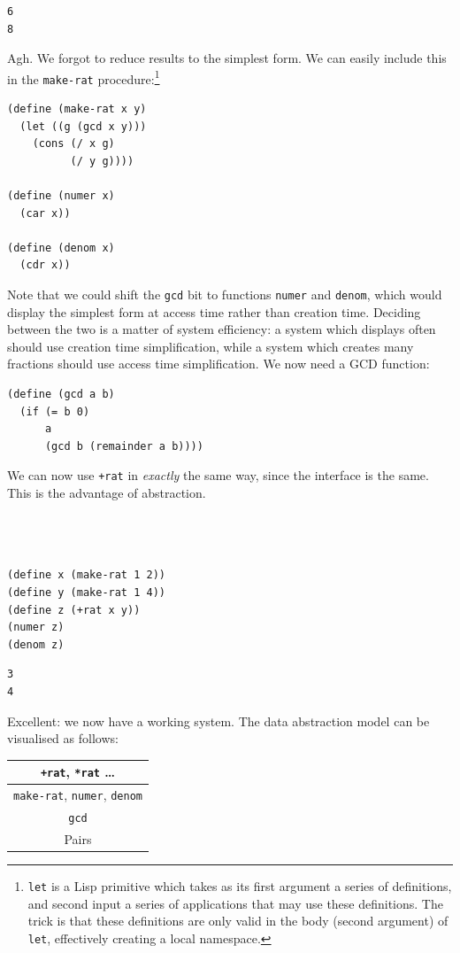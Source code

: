 \documentclass[9pt]{report}
\begin{document}
\begin{verbatim}
6
8
\end{verbatim}


Agh. We forgot to reduce results to the simplest form. We can
easily include this in the \texttt{make-rat} procedure:\footnote{\texttt{let} is a Lisp primitive which takes as its first argument a
series of definitions, and second input a series of applications that may
use these definitions. The trick is that these definitions are only
valid in the body (second argument) of \texttt{let}, effectively creating a
local namespace.}

\begin{verbatim}
(define (make-rat x y)
  (let ((g (gcd x y)))
    (cons (/ x g)
          (/ y g))))

(define (numer x)
  (car x))

(define (denom x)
  (cdr x))
\end{verbatim}

Note that we could shift the \texttt{gcd} bit to functions \texttt{numer} and
\texttt{denom}, which would display the simplest form at access time
rather than creation time. Deciding between the two is a matter of
system efficiency: a system which displays often should use
creation time simplification, while a system which creates many
fractions should use access time simplification.
We now need a GCD function:

\begin{verbatim}
(define (gcd a b)
  (if (= b 0)
      a
      (gcd b (remainder a b))))
\end{verbatim}

We can now use \texttt{+rat} in \emph{exactly} the same way, since the
interface is the same. This is the advantage of abstraction.

\begin{verbatim}



(define x (make-rat 1 2))
(define y (make-rat 1 4))
(define z (+rat x y))
(numer z)
(denom z)
\end{verbatim}

\begin{verbatim}
3
4
\end{verbatim}


Excellent: we now have a working system. The data abstraction
model can be visualised as follows:

\begin{center}
\begin{tabular}{c}
\toprule
\texttt{+rat}, \texttt{*rat} \ldots{}\\
\midrule
\texttt{make-rat}, \texttt{numer}, \texttt{denom}\\
\midrule
\texttt{gcd}\\
\midrule
Pairs\\
\bottomrule
\end{tabular}
\end{center}
\end{document}
